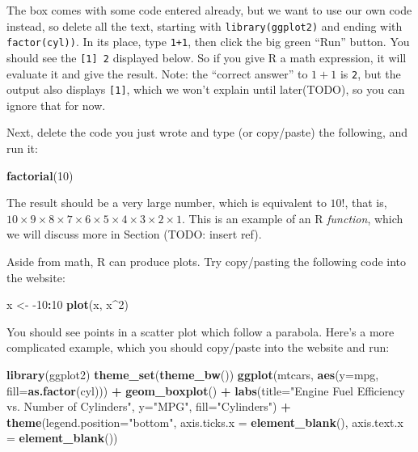 \documentclass[
]{article}
\newenvironment{Shaded}{\begin{snugshade}}{\end{snugshade}}
\newcommand{\DataTypeTok}[1]{\textcolor[rgb]{0.13,0.29,0.53}{#1}}
\newcommand{\DecValTok}[1]{\textcolor[rgb]{0.00,0.00,0.81}{#1}}
\newcommand{\KeywordTok}[1]{\textcolor[rgb]{0.13,0.29,0.53}{\textbf{#1}}}
\newcommand{\NormalTok}[1]{#1}
\newcommand{\OperatorTok}[1]{\textcolor[rgb]{0.81,0.36,0.00}{\textbf{#1}}}
\newcommand{\StringTok}[1]{\textcolor[rgb]{0.31,0.60,0.02}{#1}}
\begin{document}
The box comes with some code entered already, but we want to use our own code instead, so delete all the text, starting with \texttt{library(ggplot2)} and ending with \texttt{factor(cyl))}.
In its place, type \texttt{1+1}, then click the big green ``Run'' button.
You should see the \texttt{{[}1{]}\ 2} displayed below.
So if you give R a math expression, it will evaluate it and give the result.
Note: the ``correct answer'' to \(1+1\) is \texttt{2}, but the output also displays \texttt{{[}1{]}}, which we won't explain until later(TODO), so you can ignore that for now.

Next, delete the code you just wrote and type (or copy/paste) the following, and run it:

\begin{Shaded}
\begin{Highlighting}[]
\KeywordTok{factorial}\NormalTok{(}\DecValTok{10}\NormalTok{)}
\end{Highlighting}
\end{Shaded}

The result should be a very large number, which is equivalent to \(10!\), that is, \(10\times9\times8\times7\times6\times5\times4\times3\times2\times1\).
This is an example of an R \emph{function}, which we will discuss more in Section (TODO: insert ref).

Aside from math, R can produce plots. Try copy/pasting the following code into the website:

\begin{Shaded}
\begin{Highlighting}[]
\NormalTok{x <-}\StringTok{ }\DecValTok{-10}\OperatorTok{:}\DecValTok{10}
\KeywordTok{plot}\NormalTok{(x, x}\OperatorTok{^}\DecValTok{2}\NormalTok{)}
\end{Highlighting}
\end{Shaded}

You should see points in a scatter plot which follow a parabola.
Here's a more complicated example, which you should copy/paste into the website and run:

\begin{Shaded}
\begin{Highlighting}[]
\KeywordTok{library}\NormalTok{(ggplot2)}
\KeywordTok{theme_set}\NormalTok{(}\KeywordTok{theme_bw}\NormalTok{())}
\KeywordTok{ggplot}\NormalTok{(mtcars, }\KeywordTok{aes}\NormalTok{(}\DataTypeTok{y=}\NormalTok{mpg, }\DataTypeTok{fill=}\KeywordTok{as.factor}\NormalTok{(cyl))) }\OperatorTok{+}\StringTok{ }
\StringTok{  }\KeywordTok{geom_boxplot}\NormalTok{() }\OperatorTok{+}\StringTok{ }
\StringTok{  }\KeywordTok{labs}\NormalTok{(}\DataTypeTok{title=}\StringTok{"Engine Fuel Efficiency vs. Number of Cylinders"}\NormalTok{, }\DataTypeTok{y=}\StringTok{"MPG"}\NormalTok{, }\DataTypeTok{fill=}\StringTok{"Cylinders"}\NormalTok{) }\OperatorTok{+}\StringTok{ }
\StringTok{  }\KeywordTok{theme}\NormalTok{(}\DataTypeTok{legend.position=}\StringTok{"bottom"}\NormalTok{, }
        \DataTypeTok{axis.ticks.x =} \KeywordTok{element_blank}\NormalTok{(),}
        \DataTypeTok{axis.text.x =} \KeywordTok{element_blank}\NormalTok{())}
\end{Highlighting}
\end{Shaded}
\end{document}

